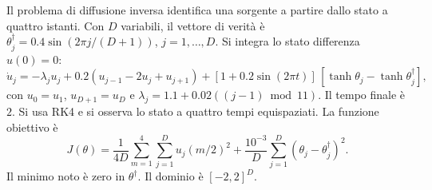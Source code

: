 Il problema di diffusione inversa identifica una sorgente a partire dallo stato a quattro istanti. Con $D$ variabili, il vettore di verità è $\theta_j^\dagger=0.4\sin(2\pi j/(D+1))$, $j=1,\ldots,D$. Si integra lo stato differenza $u(0)=0$:
\begin{equation}
 \dot u_j=-\lambda_ju_j+0.2(u_{j-1}-2u_j+u_{j+1})
 +[1+0.2\sin(2\pi t)]\,[\tanh\theta_j-\tanh\theta_j^\dagger],
\end{equation}
con $u_0=u_1$, $u_{D+1}=u_D$ e $\lambda_j=1.1+0.02((j-1)\bmod11)$. Il tempo finale è $2$. Si usa RK4 e si osserva lo stato a quattro tempi equispaziati. La funzione obiettivo è
\begin{equation}
 J(\theta)=\frac{1}{4D}\sum_{m=1}^4\sum_{j=1}^D u_j(m/2)^2
 +\frac{10^{-3}}D\sum_{j=1}^D(\theta_j-\theta_j^\dagger)^2.
\end{equation}
Il minimo noto è zero in $\theta^\dagger$. Il dominio è $[-2,2]^D$.
